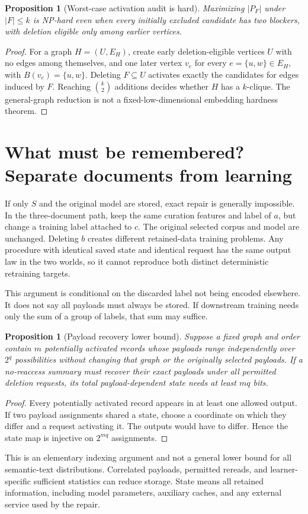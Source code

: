 \documentclass[11pt,a4paper]{article}
\newtheorem{proposition}[theorem]{Proposition}
\theoremstyle{definition}\newtheorem{definition}[theorem]{Definition}
\begin{document}
\begin{proposition}[Worst-case activation audit is hard]
Maximizing $|P_F|$ under $|F|\le k$ is NP-hard even when every initially excluded candidate has two blockers, with deletion eligible only among earlier vertices.
\end{proposition}
\begin{proof}
For a graph $H=(U,E_H)$, create early deletion-eligible vertices $U$ with no edges among themselves, and one later vertex $v_e$ for every $e=\{u,w\}\in E_H$, with $B(v_e)=\{u,w\}$. Deleting $F\subseteq U$ activates exactly the candidates for edges induced by $F$. Reaching $\binom k2$ additions decides whether $H$ has a $k$-clique. The general-graph reduction is not a fixed-low-dimensional embedding hardness theorem.
\end{proof}

\section{What must be remembered? Separate documents from learning}
If only $S$ and the original model are stored, exact repair is generally impossible. In the three-document path, keep the same curation features and label of $a$, but change a training label attached to $c$. The original selected corpus and model are unchanged. Deleting $b$ creates different retained-data training problems. Any procedure with identical saved state and identical request has the same output law in the two worlds, so it cannot reproduce both distinct deterministic retraining targets.

This argument is conditional on the discarded label not being encoded elsewhere. It does not say all payloads must always be stored. If downstream training needs only the sum of a group of labels, that sum may suffice.

\begin{proposition}[Payload recovery lower bound]
Suppose a fixed graph and order contain $m$ potentially activated records whose payloads range independently over $2^q$ possibilities without changing that graph or the originally selected payloads. If a no-reaccess summary must recover their exact payloads under all permitted deletion requests, its total payload-dependent state needs at least $mq$ bits.
\end{proposition}
\begin{proof}
Every potentially activated record appears in at least one allowed output. If two payload assignments shared a state, choose a coordinate on which they differ and a request activating it. The outputs would have to differ. Hence the state map is injective on $2^{mq}$ assignments.
\end{proof}
This is an elementary indexing argument and not a general lower bound for all semantic-text distributions. Correlated payloads, permitted rereads, and learner-specific sufficient statistics can reduce storage. State means all retained information, including model parameters, auxiliary caches, and any external service used by the repair.
\end{document}
